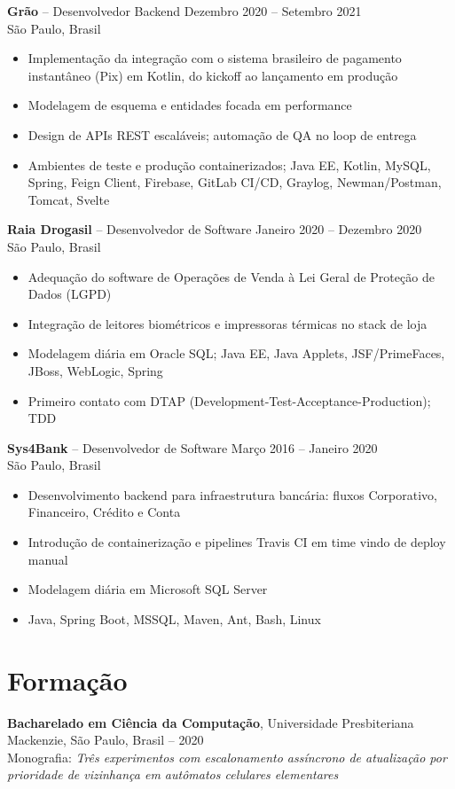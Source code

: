 \documentclass[11pt,a4paper]{article}
\begin{document}
\noindent\textbf{Grão} -- Desenvolvedor Backend \hfill Dezembro 2020 -- Setembro 2021\\
São Paulo, Brasil
\begin{itemize}
\item Implementação da integração com o sistema brasileiro de pagamento instantâneo (Pix) em Kotlin, do kickoff ao lançamento em produção
\item Modelagem de esquema e entidades focada em performance
\item Design de APIs REST escaláveis; automação de QA no loop de entrega
\item Ambientes de teste e produção containerizados; Java EE, Kotlin, MySQL, Spring, Feign Client, Firebase, GitLab CI/CD, Graylog, Newman/Postman, Tomcat, Svelte
\end{itemize}

\noindent\textbf{Raia Drogasil} -- Desenvolvedor de Software \hfill Janeiro 2020 -- Dezembro 2020\\
São Paulo, Brasil
\begin{itemize}
\item Adequação do software de Operações de Venda à Lei Geral de Proteção de Dados (LGPD)
\item Integração de leitores biométricos e impressoras térmicas no stack de loja
\item Modelagem diária em Oracle SQL; Java EE, Java Applets, JSF/PrimeFaces, JBoss, WebLogic, Spring
\item Primeiro contato com DTAP (Development-Test-Acceptance-Production); TDD
\end{itemize}

\noindent\textbf{Sys4Bank} -- Desenvolvedor de Software \hfill Março 2016 -- Janeiro 2020\\
São Paulo, Brasil
\begin{itemize}
\item Desenvolvimento backend para infraestrutura bancária: fluxos Corporativo, Financeiro, Crédito e Conta
\item Introdução de containerização e pipelines Travis CI em time vindo de deploy manual
\item Modelagem diária em Microsoft SQL Server
\item Java, Spring Boot, MSSQL, Maven, Ant, Bash, Linux
\end{itemize}

\section{Formação}
\noindent\textbf{Bacharelado em Ciência da Computação}, Universidade Presbiteriana Mackenzie, São Paulo, Brasil -- 2020\\
Monografia: \textit{Três experimentos com escalonamento assíncrono de atualização por prioridade de vizinhança em autômatos celulares elementares}
\end{document}
